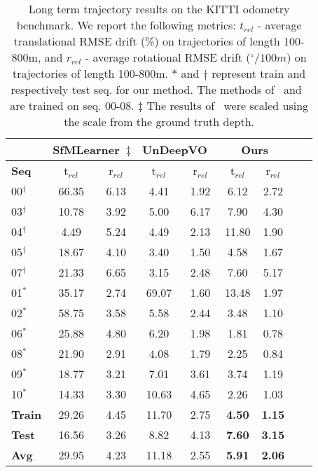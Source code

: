 \documentclass[letterpaper, 10 pt, conference]{ieeeconf}  \IEEEoverridecommandlockouts
\begin{document}
\begin{table}[!t]
\centering
{
\footnotesize
\setlength{\tabcolsep}{1.0em}
\begin{tabular}{l@{\hskip 1.5em}cc@{\hskip 1.5em}cc@{\hskip 1.5em}cc@{\hskip 1.5em}cc}



 & \multicolumn{2}{c}{SfMLearner~\cite{zhou2017unsupervised}$\ddagger$} & \multicolumn{2}{c}{UnDeepVO~\cite{li2017undeepvo}}  & \multicolumn{2}{c}{Ours} \\
\toprule
\textbf{Seq} & t$_{rel}$ & r$_{rel}$ & t$_{rel}$ & r$_{rel}$ & t$_{rel}$ & r$_{rel}$ \\
\midrule
00$^\dagger$  & 66.35 &  6.13 & 4.41 &  1.92 &  6.12 &  2.72  \\
03$^\dagger$  & 10.78 &  3.92 & 5.00 &  6.17 &  7.90 &  4.30  \\
04$^\dagger$  &  4.49 &  5.24 & 4.49 &  2.13 & 11.80 &  1.90  \\
05$^\dagger$  & 18.67 &  4.10 & 3.40 &  1.50 &  4.58 &  1.67  \\
07$^\dagger$  & 21.33 &  6.65 & 3.15 &  2.48 &  7.60 &  5.17  \\
\midrule
01$^*$        & 35.17 &  2.74 &69.07 &  1.60 & 13.48 &1.97  \\
02$^*$        & 58.75 &  3.58 & 5.58 &  2.44 & 3.48 & 1.10  \\
06$^*$        & 25.88 &  4.80 & 6.20 &  1.98 & 1.81 & 0.78  \\
08$^*$        & 21.90 &  2.91 & 4.08 &  1.79 & 2.25 & 0.84  \\
09$^*$        & 18.77 &  3.21 & 7.01 &  3.61 & 3.74 &  1.19  \\
10$^*$        & 14.33 &  3.30 &10.63 &  4.65 & 2.26 &  1.03\\
\midrule
\textbf{Train}   & 29.26 &  4.45 & 11.70 & 2.75 & \textbf{4.50} & \textbf{1.15} \\
\textbf{Test}   & 16.56 &  3.26 & 8.82 & 4.13 & \textbf{7.60} & \textbf{3.15}  \\
\textbf{Avg}   & 29.95 &  4.23 & 11.18 & 2.55 & \textbf{5.91} & \textbf{2.06}  \\
\bottomrule\end{tabular}\\\vspace{1mm}}
\caption{Long term trajectory results on the KITTI odometry benchmark. We report the following metrics: $t_{rel}$ - average translational RMSE drift (\%) on trajectories of length 100-800m, and $r_{rel}$ - average rotational RMSE drift ($^{{\circ}}/100m$) on trajectories of length 100-800m. $*$ and $\dagger$ represent train and respectively test seq. for our method. The methods of~\cite{zhou2017unsupervised} and~\cite{li2017undeepvo} are trained on seq. 00-08. $\ddagger$ The results of~\cite{zhou2017unsupervised} were scaled using the scale from the ground truth depth.}
\label{table:tajectory-accuracy}
\vspace{0mm}
\end{table}
\end{document}
